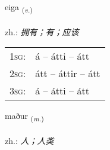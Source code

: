 \documentclass[frontgrid, backgrid]{flacards}\usepackage[]{graphicx}\usepackage[]{xcolor}
\begin{document}
{eiga \small{\textsubscript{(\textit{v.})}} \\[1ex] %
\textphonetic{[eiːɣa]} \\
zh.: \emph{拥有；有；应该} \\  [2ex]
\renewcommand*{\arraystretch}{0.8}
\begin{tabular}{p{1cm}l}
\textsc{1sg}: & á -- átti -- átt \\ 
\textsc{2sg}: & átt -- áttir -- átt \\ 
\textsc{3sg}: & á -- átti -- átt \\ 
\end{tabular}
}

\renewcommand{\flhead}{\vskip5pt \fboxsep=0pt {\small\bfseries\footnotesize Nafnorð | 名词}}
\renewcommand{\fcfoot}{\vskip5pt \fboxsep=0pt \hspace{2pt}{\small\bfseries\footnotesize 1K}}

\renewcommand{\blhead}{\vskip5pt {\small\bfseries\footnotesize Nafnorð | 名词 }}
\renewcommand{\bcfoot}{\vskip5pt \hspace{2pt}{\small\bfseries\footnotesize 1K}}


{maður \small{\textsubscript{(\textit{m.})}} \\[1ex] %
\textphonetic{[maːðʏr]} \\
zh.: \emph{人；人类} \\  [2ex]
\renewcommand*{\arraystretch}{0.8}
}


\renewcommand{\flhead}{\vskip5pt \fboxsep=0pt {\small\bfseries\footnotesize Forsetning | 介词}}
\renewcommand{\fcfoot}{\vskip5pt \fboxsep=0pt \hspace{2pt}{\small\bfseries\footnotesize 1K}}
\end{document}
